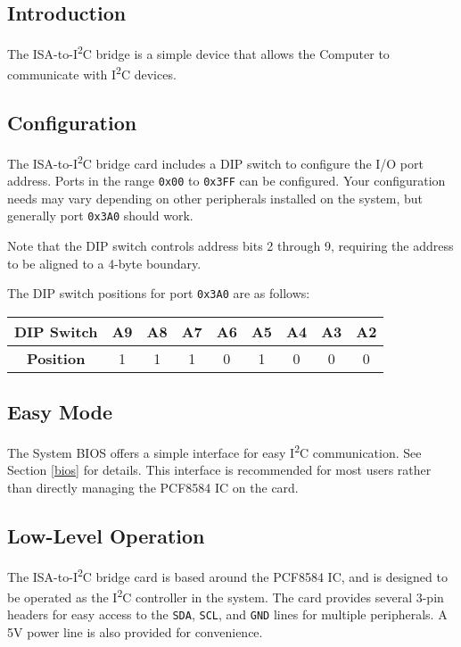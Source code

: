 \documentclass[twoside,10pt,letterpaper]{refart}
\newcommand{\itwoc}{I\textsuperscript{2}C}
\begin{document}
\subsection{Introduction}
The ISA-to-\itwoc{} bridge is a simple device that allows the  Computer to communicate
with \itwoc{} devices.

\subsection{Configuration}
The ISA-to-\itwoc{} bridge card includes a DIP switch to configure the I/O port address.
Ports in the range \texttt{0x00} to \texttt{0x3FF} can be configured. Your configuration needs may
vary depending on other peripherals installed on the system, but generally port \texttt{0x3A0} should
work.

Note that the DIP switch controls address bits 2 through 9, requiring the address to be aligned to
a 4-byte boundary.

The DIP switch positions for port \texttt{0x3A0} are as follows:

\begin{center}
    \begin{tabular}{ c|c|c|c|c|c|c|c|c }
        \textbf{DIP Switch} & A9 & A8 & A7 & A6 & A5 & A4 & A3 & A2 \\
        \hline
        \textbf{Position} & 1 & 1 & 1 & 0 & 1 & 0 & 0 & 0
    \end{tabular}
\end{center}

\subsection{Easy Mode}
The  System BIOS offers a simple interface for easy \itwoc{} communication. See Section \ref{bios} for details.
This interface is recommended for most users rather than directly managing the PCF8584 IC on the card.

\subsection{Low-Level Operation}
The ISA-to-\itwoc{} bridge card is based around the PCF8584 IC, and is designed to be operated as the \itwoc
controller in the system. The card provides several 3-pin headers for easy access to the \texttt{SDA}, \texttt{SCL},
and \texttt{GND} lines for multiple peripherals. A 5V power line is also provided for convenience.
\end{document}
